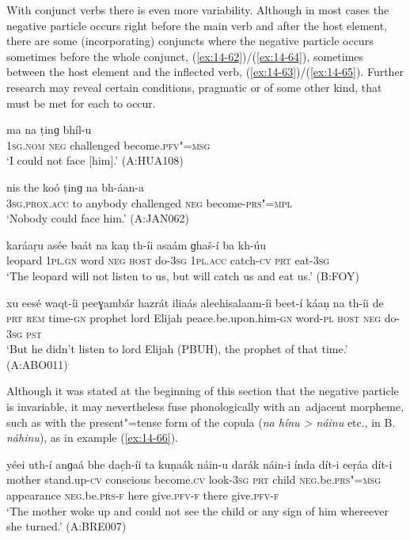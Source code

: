 With conjunct verbs there is even more variability. Although in most cases the negative particle occurs right before the main verb and after the host element, there are some (incorporating) conjuncts where the negative particle occurs sometimes before the whole conjunct, (\ref{ex:14-62})/(\ref{ex:14-64}), sometimes between the host element and the inflected verb, (\ref{ex:14-63})/(\ref{ex:14-65}). Further research may reveal certain conditions, pragmatic or of some other kind, that must be met for each to occur. 

\begin{exe}
\ex
\label{ex:14-62}
\gll ma na ṭinɡ bhíl-u \\
\textsc{1sg.nom} \textsc{neg} challenged become.\textsc{pfv"=msg } \\
\glt `I could not face [him].' (A:HUA108)

\ex
\label{ex:14-63}
\gll nis the koó ṭinɡ na  bh-áan-a \\
\textsc{3sg.prox.acc} to anybody challenged \textsc{neg} become-\textsc{prs"=mpl } \\
\glt `Nobody could face him.' (A:JAN062)

\ex
\label{ex:14-64}
\gll karáaṛu asée baát na kaṇ th-íi asaám ɡhaš-í  ba kh-úu \\
leopard \textsc{1pl.gn} word \textsc{neg} \textsc{host} do-\textsc{3sg} \textsc{1pl.acc} catch-\textsc{cv}  \textsc{prt} eat-\textsc{3sg} \\
\glt `The leopard will not listen to us, but will catch us and eat us.' (B:FOY)

\ex
\label{ex:14-65}
\gll xu eesé waqt-íi peeɣambár hazrát iliaás aleehisalaam-íi  beet-í
káaṇ na th-íi  de \\
\textsc{prt} \textsc{rem} time-\textsc{gn} prophet lord  Elijah peace.be.upon.him-\textsc{gn} word-\textsc{pl} \textsc{host} \textsc{neg} do-\textsc{3sg} \textsc{pst} \\
\glt `But he didn't listen to lord Elijah (PBUH), the prophet of that time.' (A:ABO011)
\end{exe}

Although it was stated at the beginning of this section that the negative particle is invariable, it may nevertheless fuse phonologically with an~adjacent morpheme, such as with the present"=tense form of the copula (\textit{na hínu {\textgreater} náinu} etc., in B. \textit{náhinu}), as in example (\ref{ex:14-66}).

\begin{exe}
\ex
\label{ex:14-66}
\gll yéei uth-í anɡaá bhe dac̣h-íi  ta kuṇaák náin-u darák náin-i  índa dít-i eeṛáa dít-i \\
mother stand.up-\textsc{cv} conscious become.\textsc{cv} look-\textsc{3sg}  \textsc{prt} child \textsc{neg.}be.\textsc{prs"=msg} appearance \textsc{neg.}be.\textsc{prs-f}  here give.\textsc{pfv-f} there give.\textsc{pfv-f} \\
\glt `The mother woke up and could not see the child or any sign of him whereever she turned.' (A:BRE007)
\end{exe}

